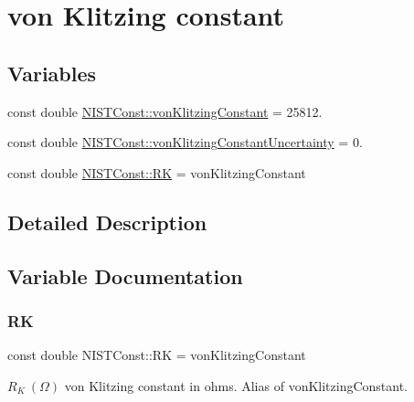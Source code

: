 \hypertarget{group__von_klitzing_constant}{}\section{von Klitzing constant}
\label{group__von_klitzing_constant}
\subsection*{Variables}
\begin{DoxyCompactItemize}
\item 
const double \hyperlink{group__von_klitzing_constant_ga664441cab64a6a8feda702f6354c1e7f}{N\+I\+S\+T\+Const\+::von\+Klitzing\+Constant} = 25812.
\item 
const double \hyperlink{group__von_klitzing_constant_ga8fa7b05f4ab4958f9bed81f592304e49}{N\+I\+S\+T\+Const\+::von\+Klitzing\+Constant\+Uncertainty} = 0.
\item 
const double \hyperlink{group__von_klitzing_constant_ga49d5fad3e8e7b5800765ce47a748ebae}{N\+I\+S\+T\+Const\+::\+RK} = von\+Klitzing\+Constant
\end{DoxyCompactItemize}


\subsection{Detailed Description}


\subsection{Variable Documentation}
\mbox{\label{group__von_klitzing_constant_ga49d5fad3e8e7b5800765ce47a748ebae}} 
\subsubsection{\texorpdfstring{RK}{RK}}
{\footnotesize\ttfamily const double N\+I\+S\+T\+Const\+::\+RK = von\+Klitzing\+Constant}

$R_K \ (\Omega)$ von Klitzing constant in ohms. Alias of von\+Klitzing\+Constant. \mbox{\label{group__von_klitzing_constant_ga664441cab64a6a8feda702f6354c1e7f}} 

